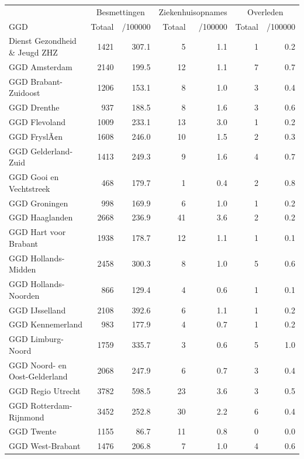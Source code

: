 \documentclass[
  english,
  man,floatsintext]{apa6}
\begin{document}
\begin{table}
\centering\begingroup\fontsize{10}{12}\selectfont

\begin{threeparttable}
\begin{tabular}{lrrrrrr}
\toprule
\multicolumn{1}{c}{ } & \multicolumn{2}{c}{Besmettingen} & \multicolumn{2}{c}{Ziekenhuisopnames} & \multicolumn{2}{c}{Overleden} \\
\cmidrule(l{3pt}r{3pt}){2-3} \cmidrule(l{3pt}r{3pt}){4-5} \cmidrule(l{3pt}r{3pt}){6-7}
GGD & Totaal & /100000 & Totaal & /100000 & Totaal & /100000\\
\midrule
Dienst Gezondheid \& Jeugd ZHZ & 1421 & 307.1 & 5 & 1.1 & 1 & 0.2\\
GGD Amsterdam & 2140 & 199.5 & 12 & 1.1 & 7 & 0.7\\
GGD Brabant-Zuidoost & 1206 & 153.1 & 8 & 1.0 & 3 & 0.4\\
GGD Drenthe & 937 & 188.5 & 8 & 1.6 & 3 & 0.6\\
GGD Flevoland & 1009 & 233.1 & 13 & 3.0 & 1 & 0.2\\
GGD FryslÃ¢n & 1608 & 246.0 & 10 & 1.5 & 2 & 0.3\\
GGD Gelderland-Zuid & 1413 & 249.3 & 9 & 1.6 & 4 & 0.7\\
GGD Gooi en Vechtstreek & 468 & 179.7 & 1 & 0.4 & 2 & 0.8\\
GGD Groningen & 998 & 169.9 & 6 & 1.0 & 1 & 0.2\\
GGD Haaglanden & 2668 & 236.9 & 41 & 3.6 & 2 & 0.2\\
GGD Hart voor Brabant & 1938 & 178.7 & 12 & 1.1 & 1 & 0.1\\
GGD Hollands-Midden & 2458 & 300.3 & 8 & 1.0 & 5 & 0.6\\
GGD Hollands-Noorden & 866 & 129.4 & 4 & 0.6 & 1 & 0.1\\
GGD IJsselland & 2108 & 392.6 & 6 & 1.1 & 1 & 0.2\\
GGD Kennemerland & 983 & 177.9 & 4 & 0.7 & 1 & 0.2\\
GGD Limburg-Noord & 1759 & 335.7 & 3 & 0.6 & 5 & 1.0\\
GGD Noord- en Oost-Gelderland & 2068 & 247.9 & 6 & 0.7 & 3 & 0.4\\
GGD Regio Utrecht & 3782 & 598.5 & 23 & 3.6 & 3 & 0.5\\
GGD Rotterdam-Rijnmond & 3452 & 252.8 & 30 & 2.2 & 6 & 0.4\\
GGD Twente & 1155 & 86.7 & 11 & 0.8 & 0 & 0.0\\
GGD West-Brabant & 1476 & 206.8 & 7 & 1.0 & 4 & 0.6\\

\end{tabular}
\end{threeparttable}
\end{table}
\end{document}
